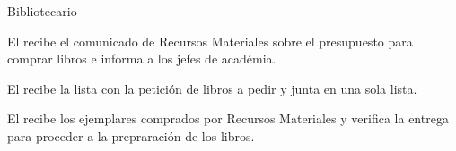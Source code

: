 \begin{PDescripcion}

  \Ppaso Bibliotecario
	\begin{enumerate}
		\Ppaso[\itarea]  El  recibe el comunicado de Recursos Materiales sobre el presupuesto para comprar libros e informa a los jefes de académia.
	\end{enumerate}

	\begin{enumerate}
		\Ppaso[\itarea]  El  recibe la lista con la petición de libros a pedir y junta en una sola lista.
	\end{enumerate}

	\begin{enumerate}
		\Ppaso[\itarea]  El  recibe los ejemplares comprados por Recursos Materiales y verifica la entrega para proceder a la prepraración de los libros.
	\end{enumerate}	
\end{PDescripcion}




